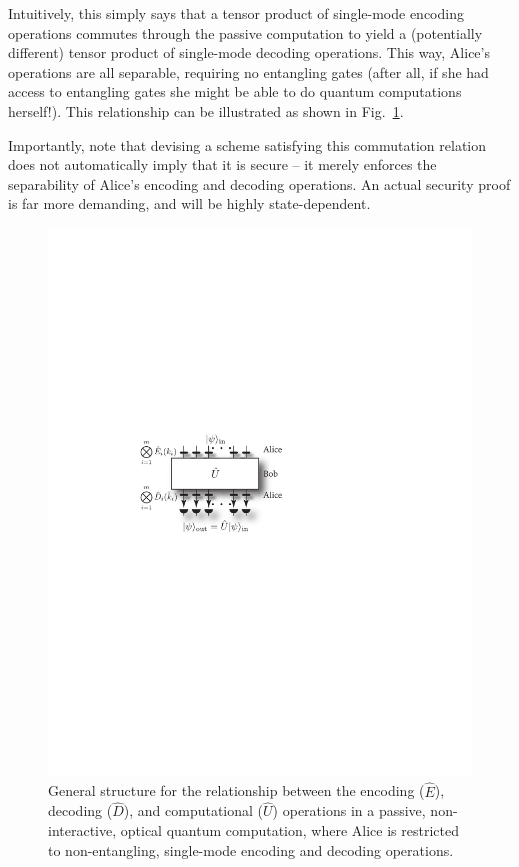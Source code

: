 \documentclass[aps, rmp, twocolumn, amsmath, amssymb, nofootinbib, superscriptaddress, longbibliography, floatfix, table-of-contents, eqsecnum]{revtex4-1}
\begin{document}
Intuitively, this simply says that a tensor product of single-mode encoding operations commutes through the passive computation to yield a (potentially different) tensor product of single-mode decoding operations. This way, Alice's operations are all separable, requiring no entangling gates (after all, if she had access to entangling gates she might be able to do quantum computations herself!). This relationship can be illustrated as shown in Fig.~\ref{fig:gen_pass_hom}.

Importantly, note that devising a scheme satisfying this commutation relation does not automatically imply that it is secure -- it merely enforces the separability of Alice's encoding and decoding operations. An actual security proof is far more demanding, and will be highly state-dependent.

\begin{figure}[!htb]
\includegraphics[width=0.85\columnwidth]{gen_pass_hom}
\caption{General structure for the relationship between the encoding ($\hat{E}$), decoding ($\hat{D}$), and computational ($\hat{U}$) operations in a passive, non-interactive, optical quantum computation, where Alice is restricted to non-entangling, single-mode encoding and decoding operations.} \label{fig:gen_pass_hom}
\end{figure}
\end{document}
